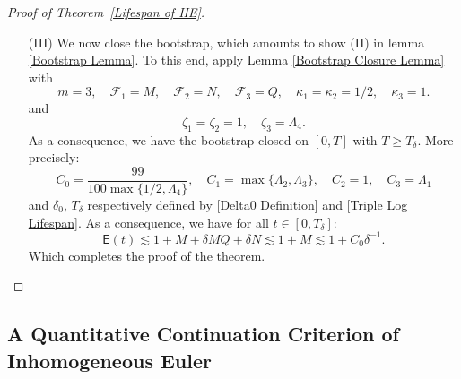 \documentclass[12pt,letterpaper]{article}
\theoremstyle{plain}
\begin{document}
\begin{proof}[Proof of Theorem~\ref{Lifespan of IIE}]
\begin{itemize}
We now introduce the following outcome $\mathscr O(t)$: We say $\mathscr O(t)$ holds if 
 there exists $\Lambda_1,\Lambda_2,\Lambda_3,\Lambda_4>0$ such that 
\begin{equation*}
M(t)\le \exp(e^{\Lambda_1 t}),\quad N(t)\le \exp(\Lambda_2\exp(e^{\Lambda_1t})),\quad Q(t)\le \Lambda_4\exp(\Lambda_3\exp(e^{\Lambda_1 t}).
\end{equation*}
Apply Lemma \ref{Hierarchical Growth of Norms for Bou and IIE} to \eqref{Relaxed Differential Inequality System IIE}, with the same $M$,$N$,$Q$ and constant $9e^2C$, it follows that $\mathscr H(t)$ implies $\mathscr O(t)$. Since $M,N,Q$ are all absolutely continuous and increasing with $M(0)=N(0)=1$, $Q(0)=0$, there exists sufficiently small $t$ such that $\mathscr H(t)$ holds. On the other hand, the closedness condition trivially holds for $\mathscr O(t)$.

\item [(III)] We now close the bootstrap, which amounts to show (II) in lemma \ref{Bootstrap Lemma}. To this end, apply Lemma \ref{Bootstrap Closure Lemma} with
\begin{equation*}
  m=3,\quad\mathcal F_1=M,\quad \mathcal F_2=N,\quad \mathcal F_3=Q,\quad \kappa_1=\kappa_2=1/2,\quad \kappa_3=1.  
\end{equation*}
and
\begin{equation*}
 \zeta_1=\zeta_2=1,\quad \zeta_3=   \Lambda_4.
\end{equation*}
As a consequence, we have the bootstrap closed on $[0,T]$ with $T\ge T_\delta$. More precisely:
\begin{equation*}
C_0=\frac{99}{100\max\{1/2,\Lambda_4\}},\quad C_1=\max\{\Lambda_2,\Lambda_3\},\quad C_2=1,\quad C_3=\Lambda_1    
\end{equation*}
and $\delta_0$, $T_\delta$ respectively defined by \eqref{Delta0 Definition} and \eqref{Triple Log Lifespan}. As a consequence, we have for all $t\in [0,T_\delta]$:
\begin{equation*}
  \mathsf E(t)\lesssim 1+M+\delta MQ +\delta N\lesssim 1+M\lesssim 1+C_0\delta^{-1}. 
\end{equation*}
Which completes the proof of the theorem.

\end{itemize}

\end{proof}

\subsection{A Quantitative Continuation Criterion of Inhomogeneous Euler}
\end{document}
